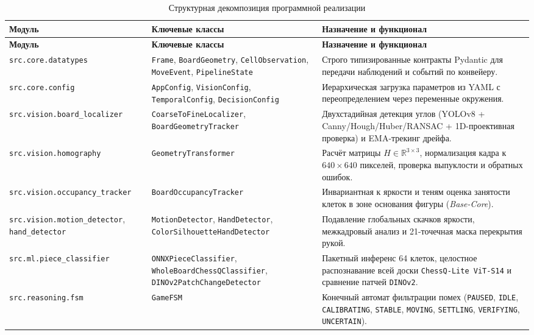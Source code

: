 \begin{longtable}{|>{\raggedright\arraybackslash}p{}|>{\raggedright\arraybackslash}p{}|>{\raggedright\arraybackslash}p{}|}
\caption{Структурная декомпозиция программной реализации}\label{tab:code-structure} \\
\hline
\textbf{Модуль} & \textbf{Ключевые классы} & \textbf{Назначение и функционал} \\
\hline
\endfirsthead
\hline
\textbf{Модуль} & \textbf{Ключевые классы} & \textbf{Назначение и функционал} \\
\hline
\endhead
\texttt{src.core.datatypes} & \texttt{Frame}, \texttt{BoardGeometry}, \texttt{CellObservation}, \texttt{MoveEvent}, \texttt{PipelineState} & Строго типизированные контракты Pydantic для передачи наблюдений и событий по конвейеру. \\
\hline
\texttt{src.core.config} & \texttt{AppConfig}, \texttt{VisionConfig}, \texttt{TemporalConfig}, \texttt{DecisionConfig} & Иерархическая загрузка параметров из YAML с переопределением через переменные окружения. \\
\hline
\texttt{src.vision.board\_localizer} & \texttt{CoarseToFineLocalizer}, \texttt{BoardGeometryTracker} & Двухстадийная детекция углов (YOLOv8 + Canny/Hough/Huber/RANSAC + 1D-проективная проверка) и EMA-трекинг дрейфа. \\
\hline
\texttt{src.vision.homography} & \texttt{GeometryTransformer} & Расчёт матрицы $H \in \mathbb{R}^{3 \times 3}$, нормализация кадра к $640 \times 640$ пикселей, проверка выпуклости и обратных ошибок. \\
\hline
\texttt{src.vision.occupancy\_tracker} & \texttt{BoardOccupancyTracker} & Инвариантная к яркости и теням оценка занятости клеток в зоне основания фигуры (\textit{Base-Core}). \\
\hline
\texttt{src.vision.motion\_detector}, \texttt{hand\_detector} & \texttt{MotionDetector}, \texttt{HandDetector}, \texttt{ColorSilhouetteHandDetector} & Подавление глобальных скачков яркости, межкадровый анализ и 21-точечная маска перекрытия рукой. \\
\hline
\texttt{src.ml.piece\_classifier} & \texttt{ONNXPieceClassifier}, \texttt{WholeBoardChessQClassifier}, \texttt{DINOv2PatchChangeDetector} & Пакетный инференс 64 клеток, целостное распознавание всей доски \texttt{ChessQ-Lite ViT-S14} и сравнение патчей \texttt{DINOv2}. \\
\hline
\texttt{src.reasoning.fsm} & \texttt{GameFSM} & Конечный автомат фильтрации помех (\texttt{PAUSED}, \texttt{IDLE}, \texttt{CALIBRATING}, \texttt{STABLE}, \texttt{MOVING}, \texttt{SETTLING}, \texttt{VERIFYING}, \texttt{UNCERTAIN}). \\

\end{longtable}
